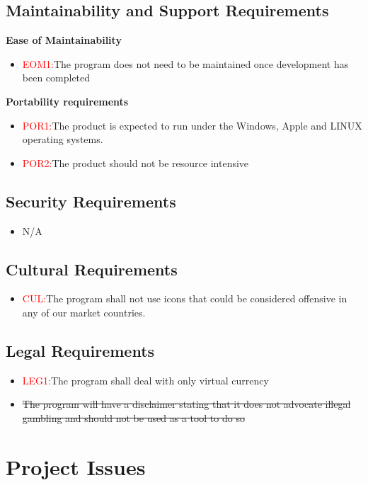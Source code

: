 \documentclass[12pt]{article}
\begin{document}
	\subsection{Maintainability and Support Requirements}
	\textbf{Ease of Maintainability}
	\begin{itemize}
	\item	\textcolor{red}{EOM1:}The program does not need to be maintained once development has been completed
	\end{itemize}
	\textbf{Portability requirements}
	\begin{itemize}
	\item	\textcolor{red}{POR1:}The product is expected to run under the Windows, Apple and LINUX operating 				systems.
	\item 	\textcolor{red}{POR2:}The product should not be resource intensive
	\end{itemize}

	\subsection{Security Requirements}
	\begin{itemize}
	\item 	N/A
	\end{itemize}
	\subsection{Cultural Requirements}
	\begin{itemize}
	\item 	\textcolor{red}{CUL:}The program shall not use icons that could be considered offensive in any of 				our market countries.
	\end{itemize}
	\subsection{Legal Requirements}
	\begin{itemize}
	\item	\textcolor{red}{LEG1:}The program shall deal with only virtual currency
	\item 	\sout{The program will have a disclaimer stating that it does not advocate illegal 				gambling and should not be used as a tool to do so}
	\end{itemize}
	\section{Project Issues}
\end{document}

